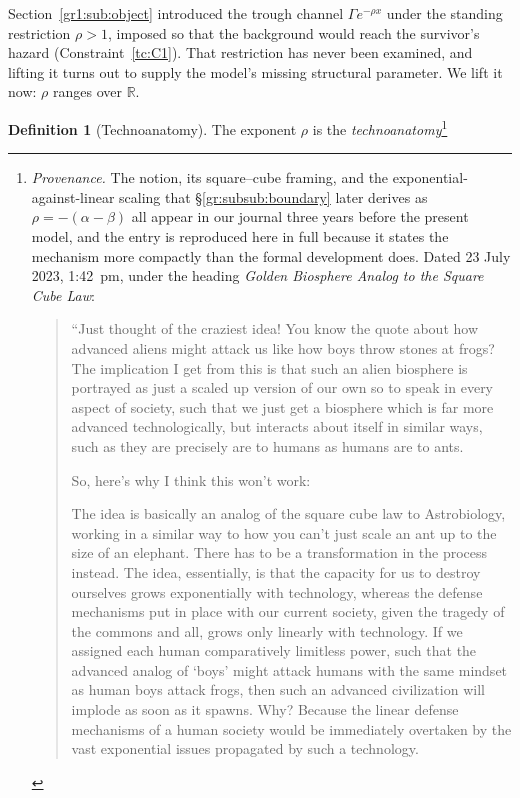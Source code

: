 \documentclass[11pt]{article}
\numberwithin{equation}{section}
\theoremstyle{plain}
\theoremstyle{definition}
\newtheorem{definition}[theorem]{Definition}
\theoremstyle{remark}
\newcommand{\R}{\mathbb{R}}
\begin{document}
Section~\ref{gr1:sub:object} introduced the trough channel
$\Gamma e^{-\rho x}$ under the standing restriction $\rho>1$, imposed so
that the background would reach the survivor's hazard
(Constraint~\ref{tc:C1}). That restriction has never been examined, and
lifting it turns out to supply the model's missing structural
parameter. We lift it now: $\rho$ ranges over $\R$.

\begin{definition}[Technoanatomy]\label{gr1:def:anatomy}
The exponent $\rho$ is the \emph{technoanatomy}\footnote{%
\emph{Provenance.} The notion, its square--cube framing, and the
exponential-against-linear scaling that
\S\ref{gr:subsub:boundary} later derives as $\rho=-(\alpha-\beta)$ all appear in
our journal three years before the present model, and the entry
is reproduced here in full because it states the mechanism more
compactly than the formal development does. Dated 23 July 2023,
1:42~pm, under the heading \emph{Golden Biosphere Analog to the Square
Cube Law}:
\begin{quote}\small
``Just thought of the craziest idea! You know the quote about how
advanced aliens might attack us like how boys throw stones at frogs? The
implication I get from this is that such an alien biosphere is portrayed
as just a scaled up version of our own so to speak in every aspect of
society, such that we just get a biosphere which is far more advanced
technologically, but interacts about itself in similar ways, such as
they are precisely are to humans as humans are to ants.

So, here's why I think this won't work:

The idea is basically an analog of the square cube law to
Astrobiology, working in a similar way to how you can't just scale an
ant up to the size of an elephant. There has to be a transformation in
the process instead. The idea, essentially, is that the capacity for us to destroy ourselves
grows exponentially with technology, whereas the defense mechanisms put
in place with our current society, given the tragedy of the commons and
all, grows only linearly with technology. If we assigned each human
comparatively limitless power, such that the advanced analog of
`boys' might attack humans with the same mindset as human boys attack
frogs, then such an advanced civilization will implode as soon as it
spawns. Why? Because the linear defense mechanisms of a human society
would be immediately overtaken by the vast exponential issues propagated
by such a technology.


\end{quote}}
\end{definition}
\end{document}
